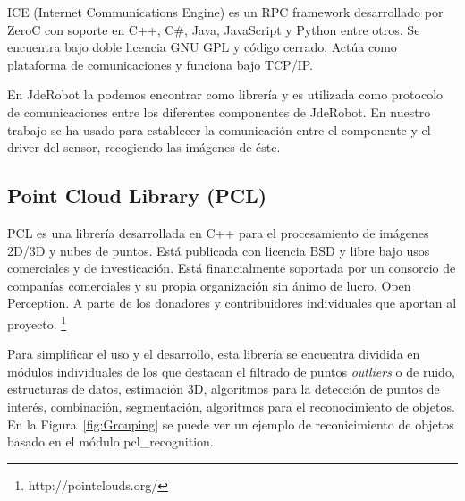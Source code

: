 ICE (Internet Communications Engine) es un RPC framework desarrollado por ZeroC con soporte en C++, C\#, Java, JavaScript y Python entre otros. Se encuentra bajo doble licencia GNU GPL y código cerrado. Actúa como plataforma de comunicaciones y funciona bajo TCP/IP.

En JdeRobot la podemos encontrar como librería y es utilizada como protocolo de comunicaciones entre los diferentes componentes de JdeRobot. En nuestro trabajo se ha usado para establecer la comunicación entre el componente y el driver del sensor, recogiendo las imágenes de éste.

\subsection{Point Cloud Library (PCL)}

PCL es una librería desarrollada en C++ para el procesamiento de imágenes 2D/3D y nubes de puntos. Está publicada con licencia BSD y libre bajo usos comerciales y de investicación. Está financialmente soportada por un consorcio de companías comerciales y su propia organización sin ánimo de lucro, Open Perception. A parte de los donadores y contribuidores individuales que aportan al proyecto. \footnote{http://pointclouds.org/}

Para simplificar el uso y el desarrollo, esta librería se encuentra dividida en módulos individuales de los que destacan el filtrado de puntos \textit{outliers} o de ruido, estructuras de datos, estimación 3D, algoritmos para la detección de puntos de interés, combinación, segmentación, algoritmos para el reconocimiento de objetos. En la Figura~\ref{fig:Grouping} se puede ver un ejemplo de reconicimiento de objetos basado en el módulo pcl\_recognition.

